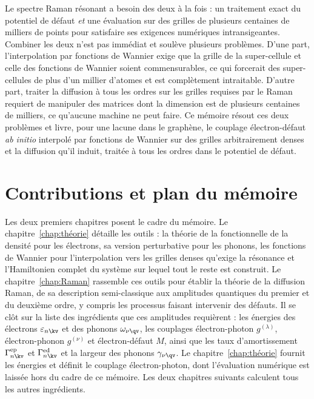 Le spectre Raman résonant a besoin des deux à la fois : un traitement exact du potentiel de défaut \textit{et} une évaluation sur des grilles de plusieurs centaines de milliers de points pour satisfaire ses exigences numériques intransigeantes. Combiner les deux n'est pas immédiat et soulève plusieurs problèmes. D'une part, l'interpolation par fonctions de Wannier exige que la grille de la super-cellule et celle des fonctions de Wannier soient commensurables, ce qui forcerait des super-cellules de plus d'un millier d'atomes et est complètement intraitable. D'autre part, traiter la diffusion à tous les ordres sur les grilles requises par le Raman requiert de manipuler des matrices dont la dimension est de plusieurs centaines de milliers, ce qu'aucune machine ne peut faire. Ce mémoire résout ces deux problèmes et livre, pour une lacune dans le graphène, le couplage électron-défaut \textit{ab initio} interpolé par fonctions de Wannier sur des grilles arbitrairement denses et la diffusion qu'il induit, traitée à tous les ordres dans le potentiel de défaut.

\section{Contributions et plan du mémoire}
\label{sec:intro-contributions}

Les deux premiers chapitres posent le cadre du mémoire. Le chapitre~\ref{chap:théorie} détaille les outils : la théorie de la fonctionnelle de la densité pour les électrons, sa version perturbative pour les phonons, les fonctions de Wannier pour l'interpolation vers les grilles denses qu'exige la résonance et l'Hamiltonien complet du système sur lequel tout le reste est construit. Le chapitre~\ref{chap:Raman} rassemble ces outils pour établir la théorie de la diffusion Raman, de sa description semi-classique aux amplitudes quantiques du premier et du deuxième ordre, y compris les processus faisant intervenir des défauts. Il se clôt sur la liste des ingrédients que ces amplitudes requièrent : les énergies des électrons $\varepsilon_{n\kv}$ et des phonons $\omega_{\nu\qv}$, les couplages électron-photon $g^{(\lambda)}$, électron-phonon $g^{(\nu)}$ et électron-défaut $M$, ainsi que les taux d'amortissement $\Gamma^\text{ep}_{n\kv}$ et $\Gamma^\text{ed}_{n\kv}$ et la largeur des phonons $\gamma_{\nu\qv}$. Le chapitre~\ref{chap:théorie} fournit les énergies et définit le couplage électron-photon, dont l'évaluation numérique est laissée hors du cadre de ce mémoire. Les deux chapitres suivants calculent tous les autres ingrédients.

